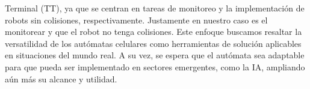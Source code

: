         Terminal (TT), ya que se centran en tareas de monitoreo y la implementaci\'on de robots sin colisiones,
        respectivamente. Justamente en nuestro caso es el monitorear y que el robot no tenga colisiones.
    \vskip 0.5cm
    Este enfoque buscamos resaltar la versatilidad de los aut\'omatas celulares como herramientas de soluci\'on
        aplicables en situaciones del mundo real. A su vez, se espera que el aut\'omata sea adaptable para que pueda ser
        implementado en sectores emergentes, como la IA, ampliando a\'un m\'as su alcance y utilidad.
    
    
\clearpage